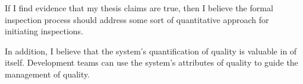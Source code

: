 
If I find evidence that my thesis claims are true, then I believe the
formal inspection process should address some sort of quantitative approach
for initiating inspections.

In addition, I believe that the system's quantification of quality is
valuable in of itself. Development teams can use the system's attributes of
quality to guide the management of quality.





